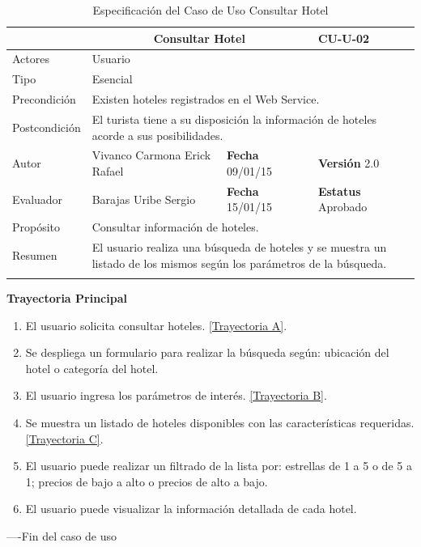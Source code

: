 \begin{longtable}{|p{2.5cm}|p{6.4cm}|p{2cm}|p{2cm}|}
	\hline
		\rowcolor[RGB]{51,153,255}{Caso de Uso}&\multicolumn{2}{c}{Consultar Hotel}&{\textbf{CU-U-02}}\\
	\hline
		{Actores}&\multicolumn{3}{p{11.2cm}|}{Usuario}\\
	\hline
		{Tipo}&\multicolumn{3}{p{11.2cm}|}{Esencial}\\
	\hline
		{Precondición}&\multicolumn{3}{p{11.2cm}|}{	Existen hoteles registrados en el Web Service.}\\
	\hline
		{Postcondición}&\multicolumn{3}{p{11.2cm}|}{El turista tiene a su disposición la información de hoteles acorde a sus posibilidades.}\\
	\hline
		{Autor}&{Vivanco Carmona Erick Rafael}&{\textbf{Fecha} 09/01/15}&{\textbf{Versión} 2.0}\\
			\hline
		{Evaluador}&{Barajas Uribe Sergio}&{\textbf{Fecha} 15/01/15}&{\textbf{Estatus} Aprobado}\\
	\hline
		{Propósito}&\multicolumn{3}{p{11.2cm}|}{Consultar información de hoteles.}\\
	\hline
		{Resumen}&\multicolumn{3}{p{11.2cm}|}{El usuario realiza una búsqueda de hoteles y se muestra un listado de los mismos según los parámetros de la búsqueda. }\\	
	\hline
	\caption[Especificación del Caso de Uso Consultar Hotel]{Especificación del Caso de Uso Consultar Hotel}
    	\label{tab:cuConsultarHotel}
\end{longtable}

\begin{flushleft}
	\textbf{Trayectoria Principal}\\
	\begin{enumerate}
		\item El usuario solicita consultar hoteles. \hyperlink{TrayectoriaA_CU-U-02}{[Trayectoria A]}.
		\item Se despliega un formulario para realizar la búsqueda según: ubicación del hotel o categoría del hotel.
		\item El usuario ingresa los parámetros de interés. \hyperlink{TrayectoriaB_CU-U-02}{[Trayectoria B]}.
		\item Se  muestra un listado de hoteles disponibles con las características requeridas. \hyperlink{TrayectoriaC_CU-U-02}{[Trayectoria C]}.
		\item El usuario puede realizar un filtrado de la lista por: estrellas de 1 a 5 o de 5 a 1; precios de bajo a alto o precios de alto a bajo.
		\item El usuario puede visualizar la información detallada de cada hotel.
	\end{enumerate}
\end{flushleft}
----Fin del caso de uso

